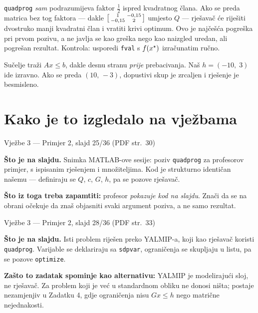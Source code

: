 \begin{zamka}
\texttt{quadprog} \emph{sam} podrazumijeva faktor $\tfrac12$ ispred kvadratnog
člana. Ako se preda matrica bez tog faktora --- dakle
$\begin{bsmallmatrix}1 & -0{,}15\\ -0{,}15 & 2\end{bsmallmatrix}$ umjesto $Q$ ---
rješavač će riješiti dvostruko manji kvadratni član i vratiti krivi optimum. Ovo
je najčešća pogreška pri prvom pozivu, a ne javlja se kao greška nego kao
naizgled uredan, ali pogrešan rezultat. Kontrola: usporedi
\texttt{fval} s $f(x^{\star})$ izračunatim ručno.
\end{zamka}

\begin{zamka}[Zamka: $h$, a ne $-h$]
Sučelje traži $Ax \leq b$, dakle desnu stranu \emph{prije} prebacivanja. Naš
$h = (-10,\; 3)$ ide izravno. Ako se preda $(10,\, -3)$, dopustivi skup je
zrcaljen i rješenje je besmisleno.
\end{zamka}

\section{Kako je to izgledalo na vježbama}
\label{sec:z1d-vjezbe}

\begin{izvor}{Vježbe 3 --- Primjer 2, slajd 25/36 (PDF str.~30)}

\textbf{Što je na slajdu.} Snimka MATLAB-ove sesije: poziv \texttt{quadprog} za
profesorov primjer, s ispisanim rješenjem i množiteljima. Kod je strukturno
identičan našemu --- definiraju se $Q$, $c$, $G$, $h$, pa se pozove rješavač.

\textbf{Što iz toga treba zapamtiti:} profesor \emph{pokazuje kod na slajdu}.
Znači da se na obrani očekuje da znaš objasniti svaki argument poziva, a ne samo
rezultat.
\end{izvor}

\begin{izvor}{Vježbe 3 --- Primjer 2, slajd 28/36 (PDF str.~33)}

\textbf{Što je na slajdu.} Isti problem riješen preko YALMIP-a, koji kao rješavač
koristi \texttt{quadprog}. Varijable se deklariraju sa \texttt{sdpvar},
ograničenja se skupljaju u listu, pa se pozove \texttt{optimize}.

\textbf{Zašto to zadatak spominje kao alternativu:} YALMIP je modelirajući sloj,
ne rješavač. Za problem koji je već u standardnom obliku ne donosi ništa; postaje
nezamjenjiv u Zadatku 4, gdje ograničenja nisu $Gx \leq h$ nego matrične
nejednakosti.
\end{izvor}

